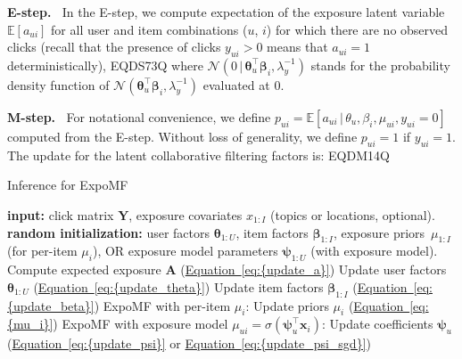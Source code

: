 \documentclass{sig-alternate-arxiv}
\begin{document}
{\vspace{0.1in}\noindent \textbf{{E-step.} \,}}
In the E-step, we compute expectation of the exposure latent variable ${\mathbb{E}}[a_{ui}]$ for all user and item combinations ($u$, $i$) for which there are no observed clicks (recall that the presence of clicks $y_{ui}>0$ means that $a_{ui}=1$ deterministically),
EQDS73Q
where $\mathcal{N}(0 {\,\vert\,} \boldsymbol\theta_u^\top\boldsymbol\beta_i, \lambda_y^{-1})$ stands for the probability density function of $\mathcal{N}(\boldsymbol\theta_u^\top\boldsymbol\beta_i, \lambda_y^{-1})$ evaluated at $0$. 

{\vspace{0.1in}\noindent \textbf{{M-step.} \,}} 
For notational convenience, we define $p_{ui} = {\mathbb{E}}[a_{ui} {\,\vert\,} \theta_u, \beta_i, \mu_{ui}, y_{ui} = 0]$ computed from the E-step. Without loss of generality, we define $p_{ui} = 1$ if $y_{ui} = 1$. The update for the latent collaborative filtering factors is:
EQDM14Q

\begin{algorithm}[t!]
\caption{Inference for ExpoMF}
\label{alg:exposure_mf}
\begin{algorithmic}[1]
\State \textbf{input:} click matrix ${ \boldsymbol{Y}}$, exposure covariates $x_{1:I}$ (topics or locations, optional).
\State \textbf{random initialization:} user factors $\boldsymbol\theta_{1:U}$, item factors $\boldsymbol\beta_{1:I}$, exposure priors~$\mu_{1:I}$ (for per-item $\mu_i$), OR exposure model parameters $\boldsymbol\psi_{1:U}$ (with exposure model).
\State Compute expected exposure ${ \boldsymbol{A}}$ ({\hyperref[eq:{update_a}]{Equation~\ref*{eq:{update_a}}}})
\State Update user factors $\boldsymbol\theta_{1:U}$ ({\hyperref[eq:{update_theta}]{Equation~\ref*{eq:{update_theta}}}})
\State Update item factors $\boldsymbol\beta_{1:I}$ ({\hyperref[eq:{update_beta}]{Equation~\ref*{eq:{update_beta}}}})
\State ExpoMF with per-item $\mu_i$:
\Statex \hspace*{.8cm} Update priors $\mu_{i}$ ({\hyperref[eq:{mu_i}]{Equation~\ref*{eq:{mu_i}}}})
\State ExpoMF with exposure model $\mu_{ui} = \sigma(\boldsymbol\psi_u^\top \mathbf{x}_i)$:
\Statex \hspace*{.8cm}Update coefficients $\boldsymbol\psi_u$ ({\hyperref[eq:{update_psi}]{Equation~\ref*{eq:{update_psi}}}} or {\hyperref[eq:{update_psi_sgd}]{Equation~\ref*{eq:{update_psi_sgd}}}})
\EndWhile 
\end{algorithmic}
\end{algorithm}
\end{document}
